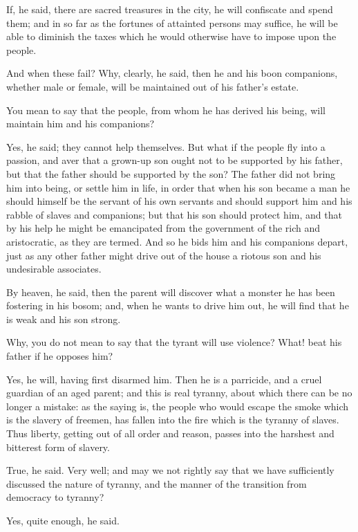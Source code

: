 If, he said, there are sacred treasures in the city, he will confiscate and spend them; and in so far as the fortunes of attainted persons may suffice, he will be able to diminish the taxes which he would otherwise have to impose upon the people.

And when these fail?
Why, clearly, he said, then he and his boon companions, whether male or female, will be maintained out of his father's estate.

You mean to say that the people, from whom he has derived his being, will maintain him and his companions?

Yes, he said; they cannot help themselves.
But what if the people fly into a passion, and aver that a grown-up son ought not to be supported by his father, but that the father should be supported by the son? The father did not bring him into being, or settle him in life, in order that when his son became a man he should himself be the servant of his own servants and should support him and his rabble of slaves and companions; but that his son should protect him, and that by his help he might be emancipated from the government of the rich and aristocratic, as they are termed. And so he bids him and his companions depart, just as any other father might drive out of the house a riotous son and his undesirable associates.

By heaven, he said, then the parent will discover what a monster he has been fostering in his bosom; and, when he wants to drive him out, he will find that he is weak and his son strong.

Why, you do not mean to say that the tyrant will use violence? What! beat his father if he opposes him?

Yes, he will, having first disarmed him.
Then he is a parricide, and a cruel guardian of an aged parent; and this is real tyranny, about which there can be no longer a mistake: as the saying is, the people who would escape the smoke which is the slavery of freemen, has fallen into the fire which is the tyranny of slaves. Thus liberty, getting out of all order and reason, passes into the harshest and bitterest form of slavery.

True, he said.
Very well; and may we not rightly say that we have sufficiently discussed the nature of tyranny, and the manner of the transition from democracy to tyranny?

Yes, quite enough, he said.